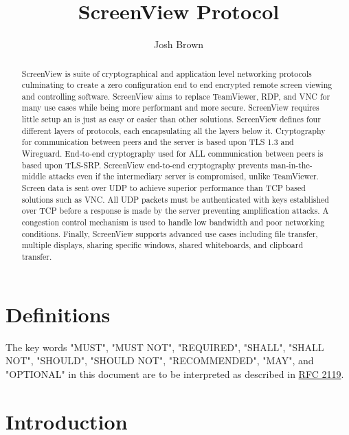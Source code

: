 \documentclass{article}
\title{\textbf{ScreenView Protocol}}
\author{Josh Brown}
\begin{document}
    \maketitle

    \begin{abstract}
        ScreenView is suite of cryptographical and application level networking protocols culminating to create a
        zero configuration end to end encrypted remote screen viewing and controlling software. ScreenView aims to
        replace TeamViewer, RDP, and VNC for many use cases while being more performant and more secure. ScreenView
        requires little setup an is just as easy or easier than other solutions. ScreenView defines four different
        layers of protocols, each encapsulating all the layers below it. Cryptography for communication between peers
        and the server is based upon TLS 1.3 and Wireguard. End-to-end cryptography used for ALL communication between
        peers is based upon TLS-SRP. ScreenView end-to-end cryptography prevents man-in-the-middle attacks even if
        the intermediary server is compromised, unlike TeamViewer. Screen data is sent over UDP to achieve superior
        performance than TCP based solutions such as VNC. All UDP packets must be authenticated with keys established
        over TCP before a response is made by the server preventing amplification attacks. A congestion control
        mechanism is used to handle low bandwidth and poor networking conditions. Finally, ScreenView supports
        advanced use cases including file transfer, multiple displays, sharing specific windows, shared whiteboards,
        and clipboard transfer.
    \end{abstract}

    \newpage

    \tableofcontents
    \newpage


    \section{Definitions}

    The key words "MUST", "MUST NOT", "REQUIRED", "SHALL", "SHALL NOT",
    "SHOULD", "SHOULD NOT", "RECOMMENDED", "MAY", and "OPTIONAL" in this
    document are to be interpreted as described in \href{https://datatracker.ietf.org/doc/html/rfc2119}{RFC 2119}.

    \newpage


    \section{Introduction}
\end{document}
